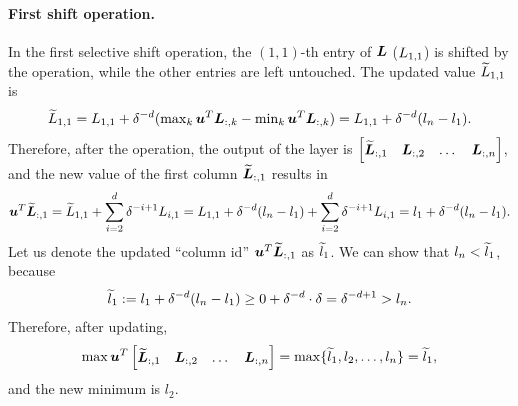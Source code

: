 \paragraph{First shift operation.}
In the first selective shift operation, the $(1,1)$-th entry of ${\bm{L}}$ (${L}_{1,1}$) is shifted by the operation, while the other entries are left untouched. The updated value $\widetilde{{L}}_{1,1}$ is
\begin{align*}
    \widetilde{{L}}_{1,1} 
    = {L}_{1,1} + \delta^{-d} (\max\nolimits_k {\bm{u}}^T {\bm{L}}_{:,k} - \min\nolimits_k {\bm{u}}^T {\bm{L}}_{:,k}) 
    = {L}_{1,1} + \delta^{-d} (l_n - l_1).
\end{align*}
Therefore, after the operation, the output of the layer is $\begin{bmatrix} \widetilde{{\bm{L}}}_{:,1} & {\bm{L}}_{:,2} & \dots & {\bm{L}}_{:,n} \end{bmatrix}$, and the new value of the first column $\widetilde{{\bm{L}}}_{:,1}$ results in
\begin{align*}
    {\bm{u}}^T \widetilde{{\bm{L}}}_{:,1}
    = \widetilde{{L}}_{1,1} + \sum_{i=2}^d \delta^{-i+1} {L}_{i,1}
    = {L}_{1,1} + \delta^{-d} (l_n - l_1) + \sum_{i=2}^d \delta^{-i+1} {L}_{i,1}
    = l_1 + \delta^{-d} (l_n - l_1).
\end{align*}
Let us denote the updated ``column id'' ${\bm{u}}^T \widetilde{{\bm{L}}}_{:,1}$ as $\widetilde{l}_1$.
We can show that $l_n < \widetilde{l}_1$, because
\begin{align*}
    \widetilde{l}_1 := l_1 + \delta^{-d} (l_n - l_1)
    \geq 0 + \delta^{-d} \cdot \delta
    = \delta^{-d + 1} > l_n.
\end{align*}
Therefore, after updating, 
\begin{equation*}
    \max {\bm{u}}^T \begin{bmatrix} \widetilde{{\bm{L}}}_{:,1} & {\bm{L}}_{:,2} & \dots & {\bm{L}}_{:,n} \end{bmatrix}
    = \max \{ \widetilde{l}_1, l_2, \dots, l_n \} = \widetilde{l}_1,
\end{equation*}
and the new minimum is $l_2$.

